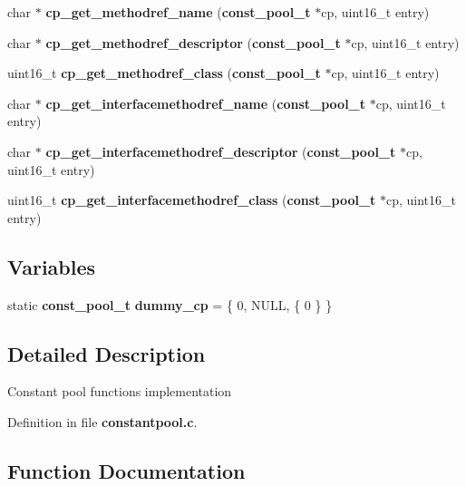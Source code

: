 \begin{DoxyCompactItemize}
\item 
char $\ast$ {\bf cp\_\-get\_\-methodref\_\-name} ({\bf const\_\-pool\_\-t} $\ast$cp, uint16\_\-t entry)
\item 
char $\ast$ {\bf cp\_\-get\_\-methodref\_\-descriptor} ({\bf const\_\-pool\_\-t} $\ast$cp, uint16\_\-t entry)
\item 
uint16\_\-t {\bf cp\_\-get\_\-methodref\_\-class} ({\bf const\_\-pool\_\-t} $\ast$cp, uint16\_\-t entry)
\item 
char $\ast$ {\bf cp\_\-get\_\-interfacemethodref\_\-name} ({\bf const\_\-pool\_\-t} $\ast$cp, uint16\_\-t entry)
\item 
char $\ast$ {\bf cp\_\-get\_\-interfacemethodref\_\-descriptor} ({\bf const\_\-pool\_\-t} $\ast$cp, uint16\_\-t entry)
\item 
uint16\_\-t {\bf cp\_\-get\_\-interfacemethodref\_\-class} ({\bf const\_\-pool\_\-t} $\ast$cp, uint16\_\-t entry)
\end{DoxyCompactItemize}
\subsection*{Variables}
\begin{DoxyCompactItemize}
\item 
static {\bf const\_\-pool\_\-t} {\bf dummy\_\-cp} = \{ 0, NULL, \{ 0 \} \}
\end{DoxyCompactItemize}


\subsection{Detailed Description}
Constant pool functions implementation 

Definition in file {\bf constantpool.c}.



\subsection{Function Documentation}
